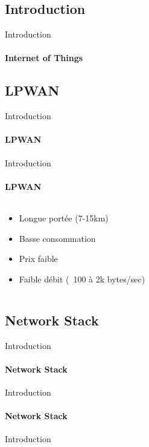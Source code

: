 \subsection{Introduction}

\begin{frame}{Introduction}
\framesubtitle{Internet of Things}

\end{frame}

\subsection{LPWAN}

\begin{frame}{Introduction}
\framesubtitle{LPWAN}

\end{frame}

\begin{frame}{Introduction}
\framesubtitle{LPWAN}
\begin{columns}
  \begin{column}{0.5\textwidth}
  \begin{itemize}
    \item Longue portée (7-15km)
    \item Basse consommation
    \item Prix faible
    \item Faible débit (~100 à 2k bytes/sec)
  \end{itemize}
  \end{column}
  \begin{column}{0.5\textwidth}
      
  \end{column}
\end{columns}
\end{frame}

\subsection{Network Stack}

\begin{frame}{Introduction}
\framesubtitle{Network Stack}

\end{frame}

\begin{frame}{Introduction}
\framesubtitle{Network Stack}

\end{frame}

\begin{frame}{Introduction}
\framesubtitle{}
\end{frame}
